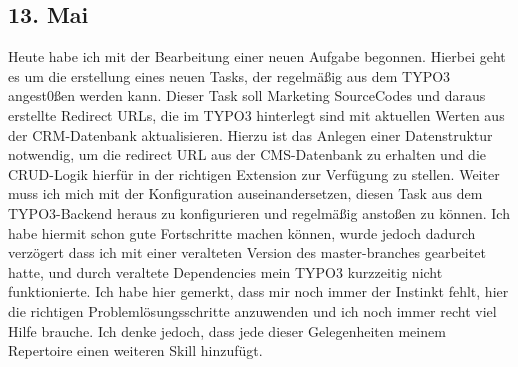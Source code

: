 \subsection{13. Mai}
Heute habe ich mit der Bearbeitung einer neuen Aufgabe begonnen. Hierbei geht es um die erstellung eines neuen Tasks, der regelmäßig aus dem TYPO3 angest0ßen werden kann. Dieser Task soll Marketing SourceCodes und daraus erstellte Redirect URLs, die im TYPO3 hinterlegt sind mit aktuellen Werten aus der CRM-Datenbank aktualisieren. Hierzu ist das Anlegen einer Datenstruktur notwendig, um die redirect URL aus der CMS-Datenbank zu erhalten und die CRUD-Logik hierfür in der richtigen Extension zur Verfügung zu stellen. Weiter muss ich mich mit der Konfiguration auseinandersetzen, diesen Task aus dem TYPO3-Backend heraus zu konfigurieren und regelmäßig anstoßen zu können. Ich habe hiermit schon gute Fortschritte machen können, wurde jedoch dadurch verzögert dass ich mit einer veralteten Version des master-branches gearbeitet hatte, und durch veraltete Dependencies mein TYPO3 kurzzeitig nicht funktionierte. Ich habe hier gemerkt, dass mir noch immer der Instinkt fehlt, hier die richtigen Problemlösungsschritte anzuwenden und ich noch immer recht viel Hilfe brauche. Ich denke jedoch, dass jede dieser Gelegenheiten meinem Repertoire einen weiteren Skill hinzufügt.